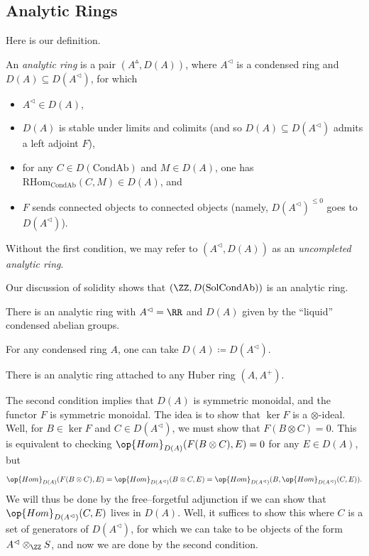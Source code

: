 \documentclass{article}
\begin{document}
\subsection{Analytic Rings}
Here is our definition.
\begin{definition}
	An \textit{analytic ring} is a pair $(A^\vartriangle,D(A))$, where $A^\vartriangleleft$ is a condensed ring and $D(A)\subseteq D(A^\vartriangleleft)$, for which
	\begin{itemize}
		\item $A^\vartriangleleft\in D(A)$,
		\item $D(A)$ is stable under limits and colimits (and so $D(A)\subseteq D(A^\vartriangleleft)$ admits a left adjoint $F$),
		\item for any $C\in D(\mathrm{CondAb})$ and $M\in D(A)$, one has $\mathrm{RHom}_{\mathrm{CondAb}}(C,M)\in D(A)$, and
		\item $F$ sends connected objects to connected objects (namely, $D(A^\vartriangleleft)^{\le0}$ goes to $D(A^\vartriangleleft)$).
	\end{itemize}
	Without the first condition, we may refer to $(A^\vartriangleleft,D(A))$ as an \textit{uncompleted analytic ring}.
\end{definition}
\begin{example}
	Our discussion of solidity shows that $(\ZZ,D(\mathrm{SolCondAb}))$ is an analytic ring.
\end{example}
\begin{example}
	There is an analytic ring with $A^\vartriangleleft=\RR$ and $D(A)$ given by the ``liquid'' condensed abelian groups.
\end{example}
\begin{example}
	For any condensed ring $A$, one can take $D(A)\coloneqq D(A^\vartriangleleft)$.
\end{example}
\begin{example}
	There is an analytic ring attached to any Huber ring $(A,A^+)$.
\end{example}
\begin{remark}
	The second condition implies that $D(A)$ is symmetric monoidal, and the functor $F$ is symmetric monoidal. The idea is to show that $\ker F$ is a $\otimes$-ideal. Well, for $B\in\ker F$ and $C\in D(A^\vartriangleleft)$, we must show that $F(B\otimes C)=0$. This is equivalent to checking $\op{Hom}_{D(A)}(F(B\otimes C),E)=0$ for any $E\in D(A)$, but
	\[\op{Hom}_{D(A)}(F(B\otimes C),E)=\op{Hom}_{D(A^\vartriangleleft)}(B\otimes C,E)=\op{Hom}_{D(A^\vartriangleleft)}(B,\op{Hom}_{D(A^\vartriangleleft)}(C,E)).\]
	We will thus be done by the free--forgetful adjunction if we can show that $\op{Hom}_{D(A^\vartriangleleft)}(C,E)$ lives in $D(A)$. Well, it suffices to show this where $C$ is a set of generators of $D(A^\vartriangleleft)$, for which we can take to be objects of the form $A^\vartriangleleft\otimes_\ZZ S$, and now we are done by the second condition.
\end{remark}
\end{document}
